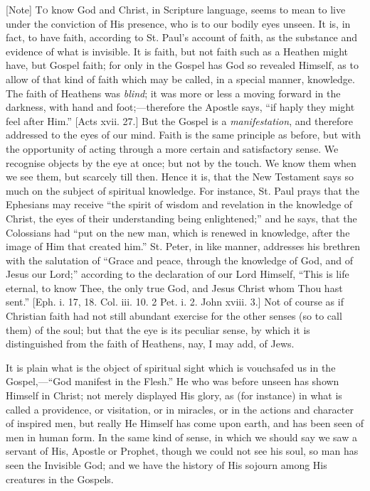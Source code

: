 [Note] T\textsc{o}
know God and Christ, in Scripture language, seems to mean to live under
the conviction of His
presence, who is to our bodily eyes unseen. It is, in fact, to have
faith, according to St. Paul's account of faith, as the substance and
evidence of what is invisible. It is faith, but not faith such as a
Heathen might have, but Gospel faith; for only in the Gospel has God so
revealed Himself, as to allow of that kind of faith which may be called,
in a special manner, knowledge. The faith of Heathens was \emph{blind};
it was more or less a moving forward in the darkness, with hand and
foot;—therefore the Apostle says, ``if haply they might feel after
Him.'' [Acts xvii. 27.] But the Gospel is a \emph{manifestation},
and therefore addressed to the eyes of our mind. Faith is the same
principle as before, but with the opportunity of acting through a more
certain and satisfactory sense. We recognise objects by the eye at once;
but not by the touch. We know them when we see them, but scarcely till
then. Hence it is, that the New Testament says so much on the subject of
spiritual knowledge. For instance, St. Paul prays that the Ephesians may
receive ``the spirit of wisdom and revelation in the knowledge of
Christ, the eyes of their understanding being enlightened;'' and he
says, that the Colossians had ``put on the new man, which is renewed
in knowledge, after the image of Him that created him.'' St. Peter,
in like manner, addresses his brethren with the salutation of
``Grace and peace, through the knowledge of God, and of Jesus our
Lord;'' according to the declaration of our Lord Himself, ``This
is life eternal, to know Thee, the only true God, and Jesus Christ whom
Thou hast sent.'' [Eph. i. 17, 18. Col. iii. 10. 2 Pet. i. 2. John
xviii. 3.] Not of course as if Christian faith had not still abundant
exercise for the other senses (so to call them) of the soul; but that
the eye is its peculiar sense, by which it is distinguished from the
faith of Heathens, nay, I may add, of Jews.

It is plain what is the object of spiritual sight which is vouchsafed
us in the Gospel,—``God manifest in the Flesh.'' He who was
before unseen has shown Himself in Christ; not merely displayed His
glory, as (for instance) in what is called a providence, or visitation,
or in miracles, or in the actions and character of inspired men, but
really He Himself has come upon earth, and has been seen of men in human
form. In the same kind of sense, in which we should say we saw a servant
of His, Apostle or Prophet, though we could not see his soul, so man has
seen the Invisible God; and we have the history of His sojourn among His
creatures in the Gospels.

